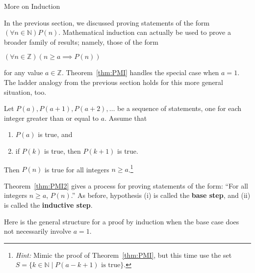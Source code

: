 \begin{section}{More on Induction}

In the previous section, we discussed proving statements of the form $(\forall n \in \mathbb{N}) P(n)$. Mathematical induction can actually be used to prove a broader family of results; namely, those of the form
\begin{center}
$(\forall n \in \mathbb{Z})(n \geq a \implies P(n))$
\end{center}
for any value $a \in \mathbb{Z}$. Theorem~\ref{thm:PMI} handles the special case when $a = 1$.  The ladder analogy from the previous section holds for this more general situation, too.

\begin{theorem}\label{thm:PMI2}
Let $P(a), P(a+1), P(a+2), \ldots$ be a sequence of statements, one for each integer greater than or equal to $a$. Assume that
\begin{enumerate}[label=\textrm{(\roman*)}]
\item $P(a)$ is true, and
\item if $P(k)$ is true, then $P(k+1)$ is true.
\end{enumerate}
Then $P(n)$ is true for all integers $n \geq a$.\footnote{\emph{Hint:} Mimic the proof of Theorem~\ref{thm:PMI}, but this time use the set $S=\{k\in \mathbb{N}\mid P(a-k+1) \text{ is true}\}$.}
\end{theorem}

Theorem~\ref{thm:PMI2} gives a process for proving statements of the form: ``For all integers $n\geq a$, $P(n)$.'' As before, hypothesis (i) is called the \textbf{base step}, and (ii) is called the \textbf{inductive step}.

\begin{skeleton}
Here is the general structure for a proof by induction when the base case does not necessarily involve $a=1$.

\begin{center}
\end{center}
\end{skeleton}
\end{section}
